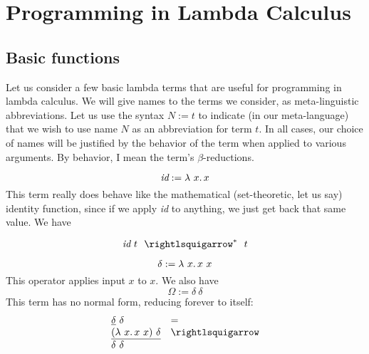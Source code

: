 \chapter{Programming in Lambda Calculus}
\label{ch:prog}

\section{Basic functions}
\label{sec:basicfuncs}

Let us consider a few basic lambda terms that are useful for
programming in lambda calculus.  We will give names to the terms we
consider, as meta-linguistic abbreviations.  Let us use the syntax $N
:= t$ to indicate (in our meta-language) that we wish to use name $N$
as an abbreviation for term $t$.  In all cases, our choice of names
will be justified by the behavior of the term when applied to various
arguments.  By behavior, I mean the term's $\beta$-reductions.

\[
\textit{id} := \lambda\ x.\, x
\]
\noindent This term really does behave like the mathematical
(set-theoretic, let us say) identity function, since if we apply
\textit{id} to anything, we just get back that same value.  We have

\[
\textit{id}\ t \ \ \betaa^* \ \ t
\]

\[
\delta := \lambda\ x.\, x\ x
\]
\noindent This operator applies input $x$ to $x$. 
We also have
\[
\Omega := \delta\ \delta
\]
\noindent This term has no normal form, reducing forever to itself:
\[
\begin{array}{ll}
  \underline{\delta}\ \delta & = \\
  \underline{(\lam{x}{x\ x})\ \delta} & \betaa \\
  \delta\ \delta &\
\end{array}
\]

